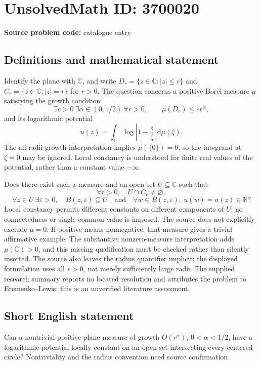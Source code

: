 \documentclass[11pt]{article}
\newcommand{\R}{\mathbb{R}}
\newcommand{\C}{\mathbb{C}}
\begin{document}
\section*{UnsolvedMath ID: 3700020}
\textbf{Source problem code:} catalogue entry
\subsection{Definitions and mathematical statement}
Identify the plane with \(\C\), and write \(D_r=\{z\in\C:|z|\le r\}\) and \(C_r=\{z\in\C:|z|=r\}\) for \(r>0\). The question concerns a positive Borel measure \(\mu\) satisfying the growth condition
\[
\exists c>0\ \exists\alpha\in(0,1/2)\ \forall r>0,\qquad \mu(D_r)\le cr^\alpha,
\]
and its logarithmic potential
\[
u(z)=\int_{\C}\log\left|1-\frac z\zeta\right|\,\mathrm d\mu(\zeta).
\]
The all-radii growth interpretation implies \(\mu(\{0\})=0\), so the integrand at \(\zeta=0\) may be ignored. Local constancy is understood for finite real values of the potential, rather than a constant value \(-\infty\).

Does there exist such a measure and an open set \(U\subseteq\C\) such that
\[
\forall r>0,\quad U\cap C_r\ne\varnothing,
\]
\[
\forall z\in U\ \exists\varepsilon>0,\quad
B(z,\varepsilon)\subseteq U\quad\text{and}\quad
\forall w\in B(z,\varepsilon),\ u(w)=u(z)\in\R?
\]
Local constancy permits different constants on different components of \(U\); no connectedness or single common value is imposed. The source does not explicitly exclude \(\mu=0\). If positive means nonnegative, that measure gives a trivial affirmative example. The substantive nonzero-measure interpretation adds \(\mu(\C)>0\), and this missing qualification must be checked rather than silently inserted. The source also leaves the radius quantifier implicit; the displayed formulation uses all \(r>0\), not merely sufficiently large radii. The supplied research summary reports no located resolution and attributes the problem to Eremenko--Lewis; this is an unverified literature assessment.
\subsection{Short English statement}
Can a nontrivial positive plane measure of growth \(O(r^\alpha)\), \(0<\alpha<1/2\), have a logarithmic potential locally constant on an open set intersecting every centered circle? Nontriviality and the radius convention need source confirmation.
\end{document}
